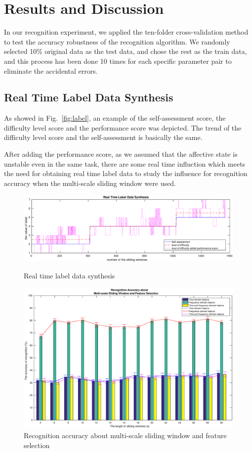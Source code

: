 \documentclass[runningheads,a4paper]{llncs}
\begin{document}
\section{Results and Discussion}
In our recognition experiment, we applied the ten-folder cross-validation method
to test the accuracy robustness of the recognition algorithm. We randomly selected
10\% original data as the test data, and chose the rest as the train data, and this
process has been done 10 times for each specific parameter pair to eliminate the
accidental errors.
\subsection{Real Time Label Data Synthesis }
As showed in Fig.~\ref{fig:label}, an example of the self-assessment score,
the difficulty level score and the performance score was depicted.
The trend of the difficulty level score and the self-assessment is basically
the same.

After adding the performance score, as we assumed that the affective state
is unstable even in the same task, there are some real time influction which
meets the need for obtaining real time label data to study the influence for recognition
accuracy when the multi-scale sliding window were used.

\begin{figure}
  \centering
  \includegraphics[width=12cm]{images/16}
  \caption{Real time label data synthesis}
  \label{fig:label}
%
  \centering
  \includegraphics[width=18cm,angle=90]{17}
  \caption{Recognition accuracy about multi-scale sliding window and feature selection}
  \label{fig:sliding}
\end{figure}
\end{document}
